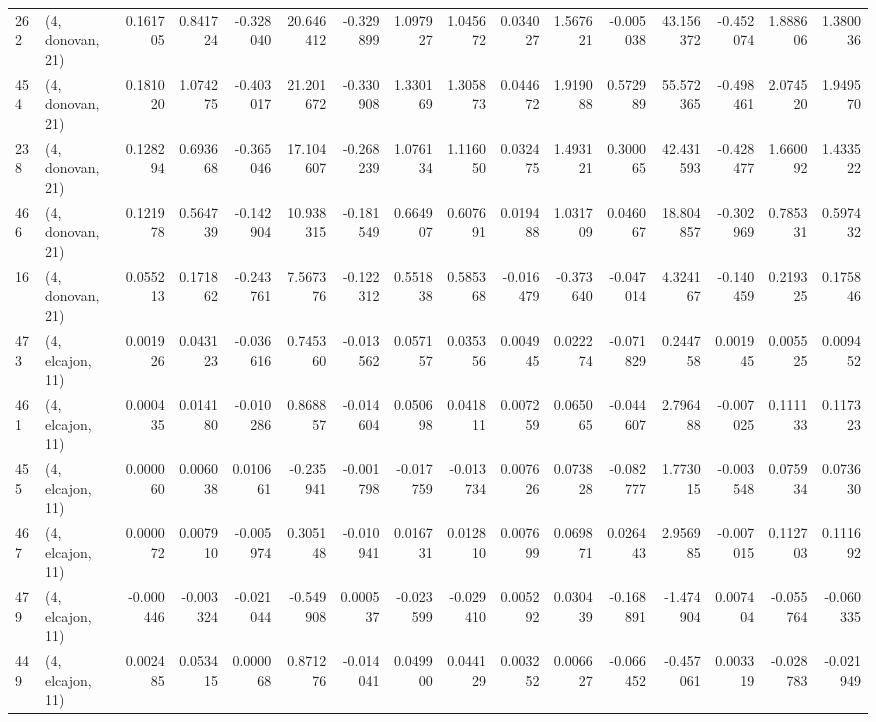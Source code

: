 \begin{tabular}{llrrrrrrrrrrrrrr}
262 &  (4, donovan, 21) &   0.161705 &  0.841724 & -0.328040 &   20.646412 & -0.329899 &   1.097927 &  1.045672 &  0.034027 &  1.567621 & -0.005038 &   43.156372 & -0.452074 &  1.888606 &  1.380036 \\
454 &  (4, donovan, 21) &   0.181020 &  1.074275 & -0.403017 &   21.201672 & -0.330908 &   1.330169 &  1.305873 &  0.044672 &  1.919088 &  0.572989 &   55.572365 & -0.498461 &  2.074520 &  1.949570 \\
238 &  (4, donovan, 21) &   0.128294 &  0.693668 & -0.365046 &   17.104607 & -0.268239 &   1.076134 &  1.116050 &  0.032475 &  1.493121 &  0.300065 &   42.431593 & -0.428477 &  1.660092 &  1.433522 \\
466 &  (4, donovan, 21) &   0.121978 &  0.564739 & -0.142904 &   10.938315 & -0.181549 &   0.664907 &  0.607691 &  0.019488 &  1.031709 &  0.046067 &   18.804857 & -0.302969 &  0.785331 &  0.597432 \\
16  &  (4, donovan, 21) &   0.055213 &  0.171862 & -0.243761 &    7.567376 & -0.122312 &   0.551838 &  0.585368 & -0.016479 & -0.373640 & -0.047014 &    4.324167 & -0.140459 &  0.219325 &  0.175846 \\
473 &  (4, elcajon, 11) &   0.001926 &  0.043123 & -0.036616 &    0.745360 & -0.013562 &   0.057157 &  0.035356 &  0.004945 &  0.022274 & -0.071829 &    0.244758 &  0.001945 &  0.005525 &  0.009452 \\
461 &  (4, elcajon, 11) &   0.000435 &  0.014180 & -0.010286 &    0.868857 & -0.014604 &   0.050698 &  0.041811 &  0.007259 &  0.065065 & -0.044607 &    2.796488 & -0.007025 &  0.111133 &  0.117323 \\
455 &  (4, elcajon, 11) &   0.000060 &  0.006038 &  0.010661 &   -0.235941 & -0.001798 &  -0.017759 & -0.013734 &  0.007626 &  0.073828 & -0.082777 &    1.773015 & -0.003548 &  0.075934 &  0.073630 \\
467 &  (4, elcajon, 11) &   0.000072 &  0.007910 & -0.005974 &    0.305148 & -0.010941 &   0.016731 &  0.012810 &  0.007699 &  0.069871 &  0.026443 &    2.956985 & -0.007015 &  0.112703 &  0.111692 \\
479 &  (4, elcajon, 11) &  -0.000446 & -0.003324 & -0.021044 &   -0.549908 &  0.000537 &  -0.023599 & -0.029410 &  0.005292 &  0.030439 & -0.168891 &   -1.474904 &  0.007404 & -0.055764 & -0.060335 \\
449 &  (4, elcajon, 11) &   0.002485 &  0.053415 &  0.000068 &    0.871276 & -0.014041 &   0.049900 &  0.044129 &  0.003252 &  0.006627 & -0.066452 &   -0.457061 &  0.003319 & -0.028783 & -0.021949 \\

\end{tabular}

